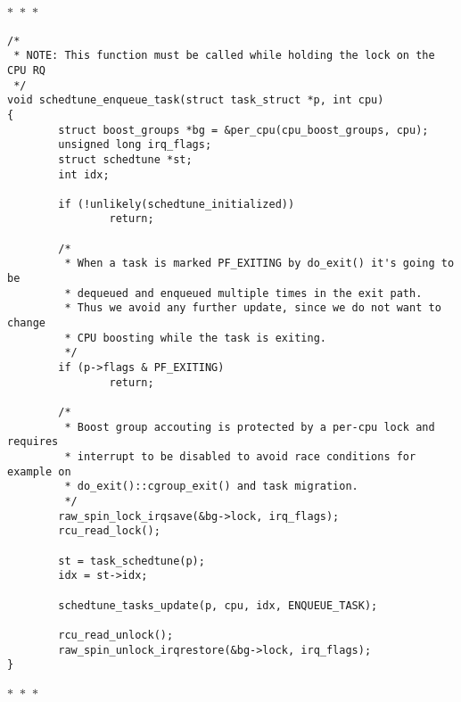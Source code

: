 \documentclass{article}
\newcommand{\divider}{{\begin{center}
  $\ast$~$\ast$~$\ast$
\end{center}}}
\begin{document}
\divider
\begin{verbatim}
/*
 * NOTE: This function must be called while holding the lock on the CPU RQ
 */
void schedtune_enqueue_task(struct task_struct *p, int cpu)
{
        struct boost_groups *bg = &per_cpu(cpu_boost_groups, cpu);
        unsigned long irq_flags;
        struct schedtune *st;
        int idx;

        if (!unlikely(schedtune_initialized))
                return;

        /*
         * When a task is marked PF_EXITING by do_exit() it's going to be
         * dequeued and enqueued multiple times in the exit path.
         * Thus we avoid any further update, since we do not want to change
         * CPU boosting while the task is exiting.
         */
        if (p->flags & PF_EXITING)
                return;

        /*
         * Boost group accouting is protected by a per-cpu lock and requires
         * interrupt to be disabled to avoid race conditions for example on
         * do_exit()::cgroup_exit() and task migration.
         */
        raw_spin_lock_irqsave(&bg->lock, irq_flags);
        rcu_read_lock();

        st = task_schedtune(p);
        idx = st->idx;

        schedtune_tasks_update(p, cpu, idx, ENQUEUE_TASK);

        rcu_read_unlock();
        raw_spin_unlock_irqrestore(&bg->lock, irq_flags);
}
\end{verbatim}
\divider
\end{document}
